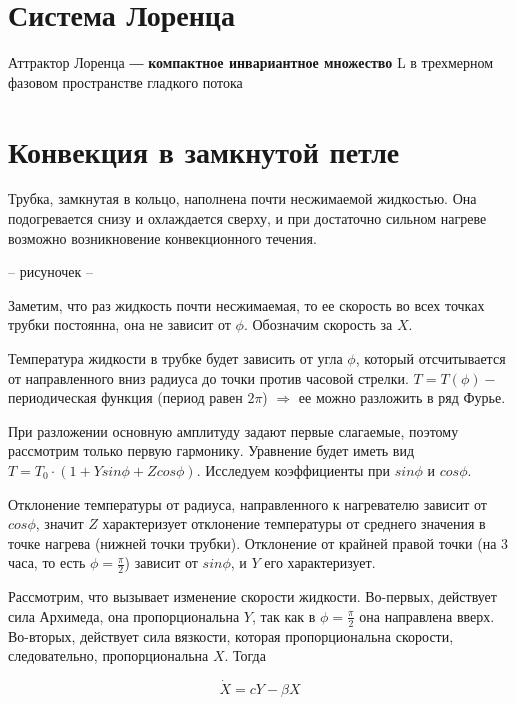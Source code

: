 \documentclass[12pt]{article}
\theoremstyle{definition}
\theoremstyle{definition}
\theoremstyle{definition}
\begin{document}

\newpage

\section{Система Лоренца}

Аттрактор Лоренца ― \textbf{компактное инвариантное множество} L в трехмерном фазовом пространстве гладкого потока

\section{Конвекция в замкнутой петле}

Трубка, замкнутая в кольцо, наполнена почти несжимаемой жидкостью. Она подогревается снизу и охлаждается сверху, и при достаточно сильном нагреве возможно возникновение конвекционного течения.

-- рисуночек --

Заметим, что раз жидкость почти несжимаемая, то ее скорость во всех точках трубки постоянна, она не зависит от $\phi$. Обозначим скорость за $X$.

Температура жидкости в трубке будет зависить от угла $\phi$, который отсчитывается от направленного вниз радиуса до точки против часовой стрелки. $T = T(\phi) -$ периодическая функция (период равен $2\pi$) $\Rightarrow$ ее можно разложить в ряд Фурье.

При разложении основную амплитуду задают первые слагаемые, поэтому рассмотрим только первую гармонику. Уравнение будет иметь вид $T = T_0 \cdot (1+Ysin\phi + Zcos\phi)$. Исследуем коэффициенты при $sin\phi$ и $cos\phi$.

Отклонение температуры от радиуса, направленного к нагревателю зависит от $cos \phi$, значит $Z$ характеризует отклонение температуры от среднего значения в точке нагрева (нижней точки трубки). Отклонение от крайней правой точки (на 3 часа, то есть $\phi = \frac{\pi}{2}$) зависит от $sin\phi$, и $Y$ его характеризует.

Рассмотрим, что вызывает изменение скорости жидкости. Во-первых, действует сила Архимеда, она пропорциональна $Y$, так как в $\phi=\frac{\pi}{2}$ она направлена вверх. Во-вторых, действует сила вязкости, которая пропорциональна скорости, следовательно, пропорциональна $X$. Тогда

\begin{equation}
	\dot{X} = cY-\beta X
\end{equation}
\end{document}
